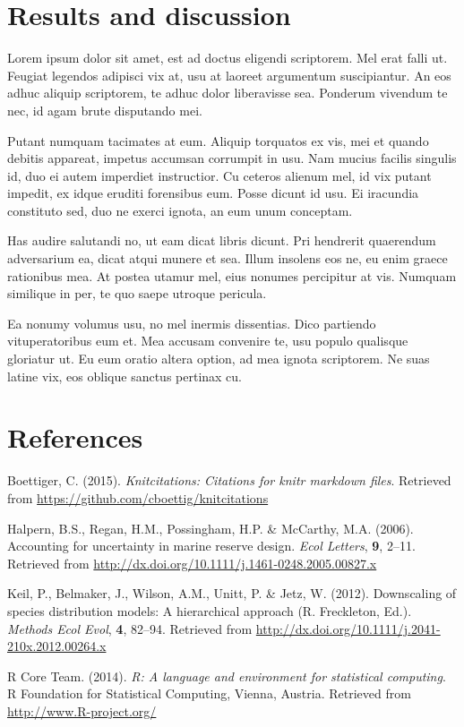 \documentclass[]{article}
\begin{document}
\section{Results and discussion}\label{results-and-discussion}

Lorem ipsum dolor sit amet, est ad doctus eligendi scriptorem. Mel erat
falli ut. Feugiat legendos adipisci vix at, usu at laoreet argumentum
suscipiantur. An eos adhuc aliquip scriptorem, te adhuc dolor
liberavisse sea. Ponderum vivendum te nec, id agam brute disputando mei.

Putant numquam tacimates at eum. Aliquip torquatos ex vis, mei et quando
debitis appareat, impetus accumsan corrumpit in usu. Nam mucius facilis
singulis id, duo ei autem imperdiet instructior. Cu ceteros alienum mel,
id vix putant impedit, ex idque eruditi forensibus eum. Posse dicunt id
usu. Ei iracundia constituto sed, duo ne exerci ignota, an eum unum
conceptam.

Has audire salutandi no, ut eam dicat libris dicunt. Pri hendrerit
quaerendum adversarium ea, dicat atqui munere et sea. Illum insolens eos
ne, eu enim graece rationibus mea. At postea utamur mel, eius nonumes
percipitur at vis. Numquam similique in per, te quo saepe utroque
pericula.

Ea nonumy volumus usu, no mel inermis dissentias. Dico partiendo
vituperatoribus eum et. Mea accusam convenire te, usu populo qualisque
gloriatur ut. Eu eum oratio altera option, ad mea ignota scriptorem. Ne
suas latine vix, eos oblique sanctus pertinax cu.

\section*{References}\label{references}

Boettiger, C. (2015). \emph{Knitcitations: Citations for knitr markdown
files}. Retrieved from \url{https://github.com/cboettig/knitcitations}

Halpern, B.S., Regan, H.M., Possingham, H.P. \& McCarthy, M.A. (2006).
Accounting for uncertainty in marine reserve design. \emph{Ecol
Letters}, \textbf{9}, 2--11. Retrieved from
\url{http://dx.doi.org/10.1111/j.1461-0248.2005.00827.x}

Keil, P., Belmaker, J., Wilson, A.M., Unitt, P. \& Jetz, W. (2012).
Downscaling of species distribution models: A hierarchical approach (R.
Freckleton, Ed.). \emph{Methods Ecol Evol}, \textbf{4}, 82--94.
Retrieved from \url{http://dx.doi.org/10.1111/j.2041-210x.2012.00264.x}

R Core Team. (2014). \emph{R: A language and environment for statistical
computing}. R Foundation for Statistical Computing, Vienna, Austria.
Retrieved from \url{http://www.R-project.org/}
\end{document}
